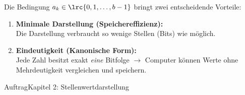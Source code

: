 \begin{frame}
Die Bedingung $a_k \in \lrc{0,1,\ldots,b-1}$ bringt zwei entscheidende Vorteile:
\vspace{3mm}
\begin{enumerate}[<+->]\setlength\itemsep{8pt}
  \item \textbf{Minimale Darstellung (Speichereffizienz):}\\
  Die Darstellung verbraucht so wenige Stellen (Bits) wie möglich.
  \item \textbf{Eindeutigkeit (Kanonische Form):}\\
  Jede Zahl besitzt exakt \emph{eine} Bitfolge $\rightarrow$ Computer können Werte ohne Mehrdeutigkeit vergleichen und speichern.
\end{enumerate}
\vspace{3mm}
\end{frame}

\begin{frame}{Auftrag}{Kapitel 2: Stellenwertdarstellung}
\vspace{3mm}
\vspace{3mm}
\end{frame}

